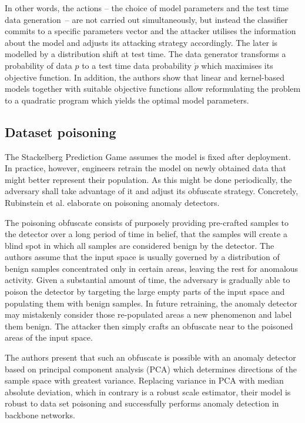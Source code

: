 In other words, the actions – the choice of model parameters and the
test time data generation~– are not carried out simultaneously, but
instead the classifier commits to a specific parameters vector and the
attacker utilises the information about the model and adjusts its
attacking strategy accordingly. The later is modelled by a distribution
shift at test time. The data generator transforms a probability of data
$p$ to a test time data probability $\dot{p}$ which maximises its
objective function. In addition, the authors show that linear and
kernel-based models together with suitable objective functions allow
reformulating the problem to a quadratic program which yields the
optimal model parameters.

\subsection{Dataset poisoning}

The Stackelberg Prediction Game assumes the model is fixed after
deployment. In practice, however, engineers retrain the model on newly
obtained data that might better represent their population. As this
might be done periodically, the adversary shall take advantage of it and
adjust its obfuscate strategy. Concretely, Rubinstein et al. \cite{antidote}
elaborate on
poisoning anomaly detectors.

The poisoning obfuscate consists of purposely providing pre-crafted
samples to the detector over a long period of time in belief, that the
samples will create a blind spot in which all samples are considered
benign by the detector. The authors assume that the input space is
usually governed by a distribution of benign samples concentrated only
in certain areas, leaving the rest for anomalous activity. Given a
substantial amount of time, the adversary is gradually able to poison
the detector by targeting the large empty parts of the input space and
populating them with benign samples. In future retraining, the anomaly
detector may mistakenly consider those re-populated areas a new
phenomenon and label them benign. The attacker then simply crafts an
obfuscate near to the poisoned areas of the input space.

The authors present that such an obfuscate is possible with an anomaly
detector based on principal component analysis (PCA) which determines
directions of the sample space with greatest variance. Replacing
variance in PCA with median absolute deviation, which in contrary is a
robust scale estimator, their model is robust to data set poisoning and
successfully performs anomaly detection in backbone networks.
